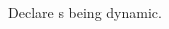 \begin{LIST}{1cm}
\begin{LIST}{.5cm}
    {
    Declare s being dynamic.
  }

  \end{LIST}
\end{LIST}




